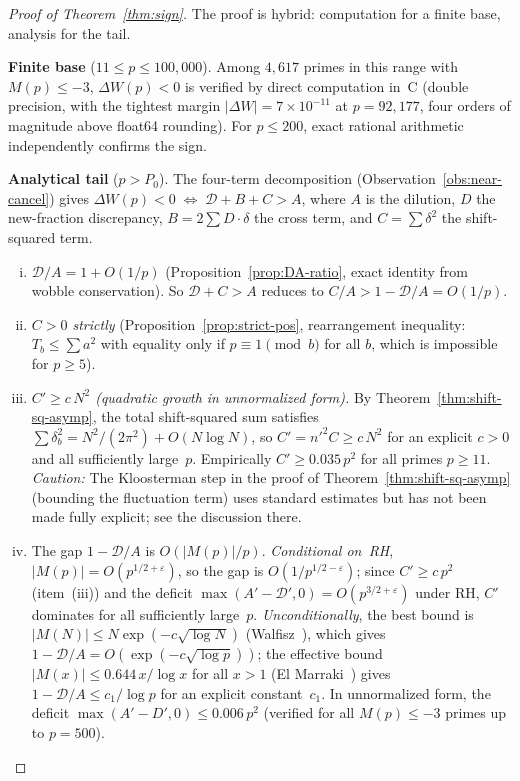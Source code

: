 \documentclass[11pt]{article}
\theoremstyle{definition}
\begin{document}
\begin{proof}[Proof of Theorem~\ref{thm:sign}]
The proof is hybrid: computation for a finite base, analysis
for the tail.

\textbf{Finite base} ($11 \le p \le 100{,}000$).
Among $4{,}617$ primes in this range with $M(p) \le -3$,
$\Delta W(p) < 0$ is verified by direct computation in~C
(double precision, with the tightest margin $|\Delta W| =
7 \times 10^{-11}$ at $p = 92{,}177$, four orders of magnitude
above float64 rounding).  For $p \le 200$, exact rational
arithmetic independently confirms the sign.

\textbf{Analytical tail} ($p > P_0$).
The four-term decomposition
(Observation~\ref{obs:near-cancel}) gives
$\Delta W(p) < 0 \;\Leftrightarrow\;
\mathcal{D} + B + C > A$,
where $A$ is the dilution, $D$ the new-fraction discrepancy,
$B = 2\sum D \cdot \delta$ the cross term, and
$C = \sum \delta^2$ the shift-squared term.

\begin{enumerate}[(i)]
\item \emph{$\mathcal{D}/A = 1 + O(1/p)$}
(Proposition~\ref{prop:DA-ratio}, exact identity from
wobble conservation).  So $\mathcal{D} + C > A$ reduces to $C/A > 1 - \mathcal{D}/A = O(1/p)$.

\item \emph{$C > 0$ strictly}
(Proposition~\ref{prop:strict-pos}, rearrangement inequality:
$T_b \le \sum a^2$ with equality only if $p \equiv 1 \pmod{b}$
for all $b$, which is impossible for $p \ge 5$).

\item \emph{$C' \ge c\,N^2$ (quadratic growth in unnormalized form).}
By Theorem~\ref{thm:shift-sq-asymp}, the total shift-squared
sum satisfies $\sum\delta_b^2 = N^2/(2\pi^2) + O(N\log N)$,
so $C' = {n'}^2 C \ge c\,N^2$ for an explicit $c > 0$
and all sufficiently large~$p$.  Empirically $C' \ge 0.035\,p^2$
for all primes $p \ge 11$.
\emph{Caution:} The Kloosterman step in the proof of
Theorem~\ref{thm:shift-sq-asymp} (bounding the fluctuation
term) uses standard estimates but has not been made fully
explicit; see the discussion there.

\item The gap $1 - \mathcal{D}/A$ is $O(|M(p)|/p)$.
\emph{Conditional on~RH}, $|M(p)| = O(p^{1/2+\varepsilon})$,
so the gap is $O(1/p^{1/2-\varepsilon})$; since
$C' \ge c\,p^2$ (item~(iii)) and the deficit
$\max(A' - \mathcal{D}', 0) = O(p^{3/2+\varepsilon})$ under RH,
$C'$ dominates for all sufficiently large~$p$.
\emph{Unconditionally}, the best bound is
$|M(N)| \le N\exp(-c\sqrt{\log N})$ (Walfisz~\cite{Walfisz1963}),
which gives $1 - \mathcal{D}/A = O(\exp(-c\sqrt{\log p}))$;
the effective bound $|M(x)| \le 0.644\,x/\log x$ for all
$x > 1$ (El Marraki~\cite{ElMarraki1995}) gives
$1 - \mathcal{D}/A \le c_1/\log p$ for an explicit
constant~$c_1$.  In unnormalized form, the deficit
$\max(A' - D', 0) \le 0.006\,p^2$ (verified for all
$M(p) \le -3$ primes up to $p = 500$).


\end{enumerate}
\end{proof}
\end{document}
